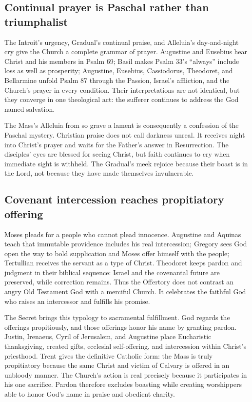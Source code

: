 \subsection*{Continual prayer is Paschal rather than triumphalist}

The Introit's urgency, Gradual's continual praise, and Alleluia's day-and-night
cry give the Church a complete grammar of prayer. Augustine and Eusebius hear
Christ and his members in Psalm 69; Basil makes Psalm 33's ``always'' include
loss as well as prosperity; Augustine, Eusebius, Cassiodorus, Theodoret, and
Bellarmine unfold Psalm 87 through the Passion, Israel's affliction, and the
Church's prayer in every condition. Their interpretations are not identical,
but they converge in one theological act: the sufferer continues to address
the God named salvation.

The Mass's Alleluia from so grave a lament is consequently a confession of the
Paschal mystery. Christian praise does not call darkness unreal. It receives
night into Christ's prayer and waits for the Father's answer in Resurrection.
The disciples' eyes are blessed for seeing Christ, but faith continues to cry
when immediate sight is withheld. The Gradual's meek rejoice because their
boast is in the Lord, not because they have made themselves invulnerable.

\subsection*{Covenant intercession reaches propitiatory offering}

Moses pleads for a people who cannot plead innocence. Augustine and Aquinas
teach that immutable providence includes his real intercession; Gregory sees
God open the way to bold supplication and Moses offer himself with the people;
Tertullian receives the servant as a type of Christ. Theodoret keeps pardon
and judgment in their biblical sequence: Israel and the covenantal future are
preserved, while correction remains. Thus the Offertory does not contrast an
angry Old Testament God with a merciful Church. It celebrates the faithful God
who raises an intercessor and fulfills his promise.

The Secret brings this typology to sacramental fulfillment. God regards the
offerings propitiously, and those offerings honor his name by granting pardon.
Justin, Irenaeus, Cyril of Jerusalem, and Augustine place Eucharistic
thanksgiving, created gifts, ecclesial self-offering, and intercession within
Christ's priesthood. Trent gives the definitive Catholic form: the Mass is
truly propitiatory because the same Christ and victim of Calvary is offered in
an unbloody manner. The Church's action is real precisely because it
participates in his one sacrifice. Pardon therefore excludes boasting while
creating worshippers able to honor God's name in praise and obedient charity.


